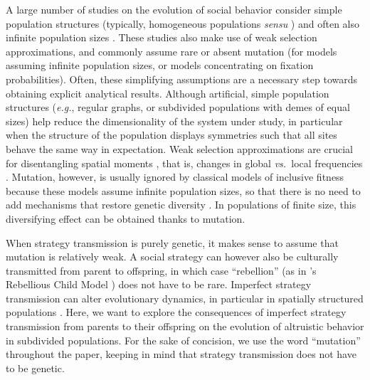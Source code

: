 \documentclass[11pt, letterpaper]{article}
\newcommand{\eg}{\textit{e.g.}}
\newcommand{\vs}{\textit{vs.\ }}
\begin{document}
A large number of studies on the evolution of social behavior consider simple population structures (typically, homogeneous populations \textit{sensu} \citet[][]{TaylorDayWild2007}) and often also infinite population sizes \citep[but see][for results on any structure]{Allen2017}. 
These studies also make use of weak selection approximations, and commonly assume rare \citep[\eg,][]{LeturqueRousset2002, Taylor2007JTB, TarnitaTaylor2014} or absent mutation (for models assuming infinite population sizes, or models concentrating on fixation probabilities). 
Often, these simplifying assumptions are a necessary step towards obtaining explicit analytical results. 
Although artificial, simple population structures (\eg, regular graphs, or subdivided populations with demes of equal sizes) help reduce the dimensionality of the system under study, in particular when the structure of the population displays symmetries such that all sites behave the same way in expectation. 
Weak selection approximations are crucial for disentangling spatial moments \citep{Lion2016}, that is, changes in global \vs local frequencies \citep[though they can in some cases be relaxed, as in][]{MullonLehmann2014}. 
Mutation, however, is usually ignored by classical models of inclusive fitness because these models assume infinite population sizes, so that there is no need to add mechanisms that restore genetic diversity \citep{TarnitaTaylor2014}. In populations of finite size,  this diversifying effect can be obtained thanks to mutation. %

When strategy transmission is purely genetic, it makes sense to assume that mutation is relatively weak. A social strategy can however also be culturally transmitted from parent to offspring, in which case ``rebellion'' (as in \citeauthor{Frank1997}'s Rebellious Child Model \citep{Frank1997}) does not have to be rare. Imperfect strategy transmission can alter evolutionary dynamics, in particular in spatially structured populations \citep[see \eg,][for graph-structured populations]{Allen2012,Debarre2017}. Here, we want to explore the consequences of imperfect strategy transmission from parents to their offspring on the evolution of altruistic behavior in subdivided populations. For the sake of concision, we use the word ``mutation'' throughout the paper, keeping in mind that strategy transmission does not have to be genetic. 
\end{document}
